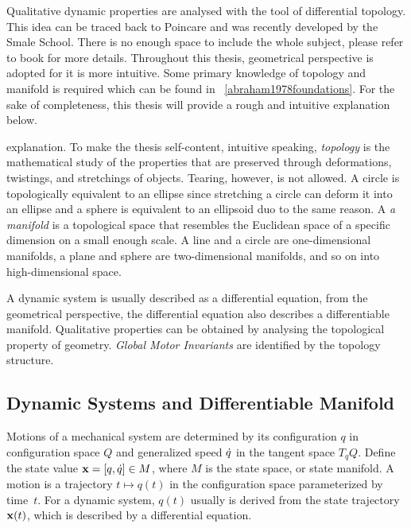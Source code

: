 Qualitative dynamic properties are analysed with the tool of differential topology.
This idea can be traced back to Poincare\citep{Poincar'e1899,Poincar'e1885} and was recently developed by the Smale School\citep{Smale1970}.
There is no enough space to include the whole subject, please refer to book \citep{abraham1978foundations}for more details.
Throughout this thesis,  geometrical perspective is adopted for it is more intuitive.
Some primary knowledge of topology and manifold is required which can be found in ~\ref{abraham1978foundations}.
For the sake of completeness, this thesis will provide a rough and intuitive explanation below.

 explanation. To make the thesis self-content, intuitive speaking,   \emph{topology} is the mathematical study of the properties that are preserved through deformations, twistings, and stretchings of objects. Tearing, however, is not allowed. 
 A circle is topologically equivalent to an ellipse since stretching a circle can deform it into an ellipse and a sphere is equivalent to an ellipsoid duo to the same reason. 
A \emph{a manifold} is a topological space that  resembles the Euclidean space of a specific dimension on a small enough scale. 
A line and a circle are one-dimensional manifolds, a plane and sphere  are two-dimensional manifolds, and so on into high-dimensional space.


A dynamic system is usually described as a differential equation, from the geometrical perspective, the differential equation also describes a differentiable manifold.
Qualitative properties can be obtained by analysing the topological  property of geometry.
\emph{Global Motor Invariants} are identified by the topology structure.





\subsection{Dynamic Systems and Differentiable Manifold}
Motions of a mechanical system are determined by its configuration  $q$ in configuration space $Q$ and generalized speed $\dot{q}$ in the tangent space $T_{q}Q$. 
Define the state value $\mathbf{x}=[q,\dot{q}] \in M$, where $M$ is the state space, or state manifold.
A motion is a trajectory $t \mapsto q(t)$ in the configuration space parameterized by time~$t$.
For a dynamic system, $q(t)$ usually is derived from the state trajectory $\mathbf{x}(t)$, which is described by a differential equation. 




